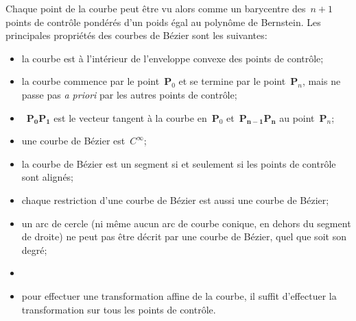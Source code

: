 Chaque point de la courbe peut être vu alors comme un barycentre des~$n+1$ points de contrôle pondérés d'un poids égal au polynôme de Bernstein. 
Les principales propriétés des courbes de Bézier sont les suivantes:
\begin{itemize}
\item la courbe est à l'intérieur de l'enveloppe convexe des points de contrôle; 
\item la courbe commence par le point~$\mathbf{P}_0$ et se termine par le point~$\mathbf{P}_n$, mais ne passe pas \emph{a priori} par les autres points de contrôle;
\item~$\mathbf{P_0P_1}$ est le vecteur tangent à la courbe en~$\mathbf{P}_0$ et~$\mathbf{P_{n-1}P_n}$ au point~$\mathbf{P}_n$;
\item une courbe de Bézier est~$C^{\infty}$;
\item la courbe de Bézier est un segment si et seulement si les points de contrôle sont alignés;
\item chaque restriction d'une courbe de Bézier est aussi une courbe de Bézier;
\item un arc de cercle (ni même aucun arc de courbe conique, en dehors du segment de droite) ne peut pas être décrit par une courbe de Bézier, quel que soit son degré;
\item {}
\item pour effectuer une transformation affine de la courbe, il suffit d'effectuer la transformation sur tous les points de contrôle. 
\end{itemize}

